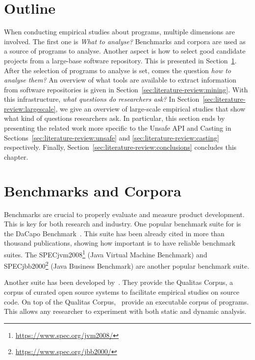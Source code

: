 \section*{Outline}

When conducting empirical studies about programs,
multiple dimensions are involved.
The first one is \emph{What to analyse?}
Benchmarks and corpora are used as a source of programs to analyse.
Another aspect is how to select good candidate projects from a large-base software repository.
This is presented in Section~\ref{sec:literature-review:benchmarks}.
After the selection of programs to analyse is set,
comes the question \emph{how to analyse them?}
An overview of what tools are available to extract information from software repositories is given in Section~\ref{sec:literature-review:mining}.
With this infrastructure, \emph{what questions do researchers ask?}
In Section~\ref{sec:literature-review:largescale},
we give an overview of large-scale empirical studies that show what kind of questions researchers ask.
In particular, this section ends by presenting the related work more specific to the Unsafe API and Casting in Sections~\ref{sec:literature-review:unsafe} and \ref{sec:literature-review:casting} respectively.
Finally, Section~\ref{sec:literature-review:conclusions} concludes this chapter.

\section{Benchmarks and Corpora}
\label{sec:literature-review:benchmarks}

Benchmarks are crucial to properly evaluate and measure product development.
This is key for both research and industry.
One popular benchmark suite for \java{} is the DaCapo Benchmark~\citep{blackburnDaCapoBenchmarksJava2006}.
This suite has been already cited in more than thousand publications, showing how important is to have reliable benchmark suites.
The SPECjvm2008\footnote{\url{https://www.spec.org/jvm2008/}}
(Java Virtual Machine Benchmark)
and
SPECjbb2000\footnote{\url{https://www.spec.org/jbb2000/}}
(Java Business Benchmark)
are another popular \java{} benchmark suite.

Another suite has been developed by~\cite{temperoQualitasCorpusCurated2010}.
They provide the Qualitas Corpus, a corpus of curated open source systems to facilitate empirical studies on source code.
On top of the Qualitas Corpus,~\cite{dietrichXCorpusExecutableCorpus2017} provide an executable corpus of \java{} programs.
This allows any researcher to experiment with both static and dynamic analysis.


